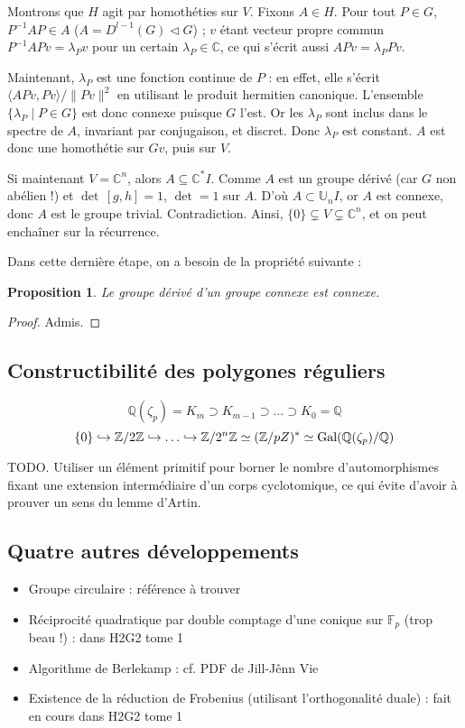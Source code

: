 \documentclass[a4paper, 11pt]{article}
\def\F{\mathbb{F}}
\def\Z{\mathbb{Z}}
\def\Q{\mathbb{Q}}
\def\C{\mathbb{C}}
\newtheorem*{proposition}{Proposition}
\begin{document}
Montrons que $H$ agit par homothéties sur $V$. Fixons $A \in H$. Pour tout $P
\in G$, $P^{-1}AP \in A$ ($A = D^{l-1}(G) \triangleleft G$) ; $v$ étant vecteur
propre commun $P^{-1}APv = \lambda_P v$ pour un certain $\lambda_P \in \C$, ce
qui s'écrit aussi $APv = \lambda_P Pv$.

Maintenant, $\lambda_P$ est une fonction continue de $P$ : en effet, elle
s'écrit $\langle APv, Pv \rangle / \|Pv\|^2$ en utilisant le produit hermitien
canonique. L'ensemble $\{ \lambda_P \mid P \in G \}$ est donc connexe puisque
$G$ l'est. Or les $\lambda_P$ sont inclus dans le spectre de $A$, invariant par
conjugaison, et discret. Donc $\lambda_P$ est constant. $A$ est donc une
homothétie sur $Gv$, puis sur $V$.

Si maintenant $V = \C^n$, alors $A \subseteq \C^*I$. Comme $A$ est un groupe
dérivé (car $G$ non abélien !) et $\det\,[g,h] = 1$, $\det = 1$ sur $A$. D'où $A
\subset \mathbb{U}_nI$, or $A$ est connexe, donc $A$ est le groupe trivial.
Contradiction. Ainsi, $\{0\} \subsetneq V \subsetneq \C^n$, et on peut enchaîner
sur la récurrence.

Dans cette dernière étape, on a besoin de la propriété suivante :
\begin{proposition}
  Le groupe dérivé d'un groupe connexe est connexe.
\end{proposition}
\begin{proof}
  Admis.
\end{proof}

\newpage


\subsection{Constructibilité des polygones réguliers}

\[ \Q(\zeta_p) = K_m \supset K_{m-1} \supset \ldots \supset K_0 = \Q \]
\[ \{0\} \hookrightarrow \Z/2\Z \hookrightarrow \ldots \hookrightarrow \Z/2^n\Z
  \simeq (\Z/pZ)^* \simeq \textnormal{Gal}(\Q(\zeta_p)/\Q) \]

TODO. Utiliser un élément primitif pour borner le nombre d'automorphismes fixant
une extension intermédiaire d'un corps cyclotomique, ce qui évite d'avoir à
prouver un sens du lemme d'Artin.


\subsection{Quatre autres développements}

\begin{itemize}
\item Groupe circulaire : référence à trouver 
\item Réciprocité quadratique par double comptage d'une conique sur $\F_p$ (trop
  beau !) : dans H2G2 tome 1
\item Algorithme de Berlekamp : cf. PDF de Jill-Jênn Vie
\item Existence de la réduction de Frobenius (utilisant l'orthogonalité duale) :
  fait en cours dans H2G2 tome 1
\end{itemize}
\end{document}
